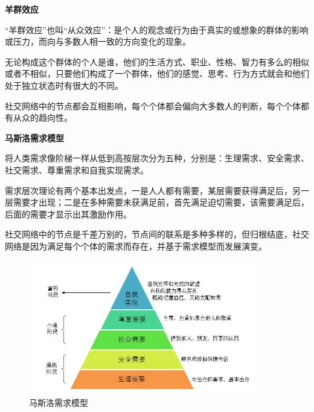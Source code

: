 \begin{frame}
	\textbf{羊群效应}
	
	“羊群效应”也叫“从众效应”：是个人的观念或行为由于真实的或想象的群体的影响或压力，而向与多数人相一致的方向变化的现象。
	
	无论构成这个群体的个人是谁，他们的生活方式、职业、性格、智力有多么的相似或者不相似，只要他们构成了一个群体，他们的感觉、思考、行为方式就会和他们处于独立状态时有很大的不同。
	
	社交网络中的节点都会互相影响，每个个体都会偏向大多数人的判断，每个个体都有从众的趋向性。
\end{frame}

\begin{frame}
	\textbf{马斯洛需求模型}
	
	将人类需求像阶梯一样从低到高按层次分为五种，分别是：生理需求、安全需求、社交需求、尊重需求和自我实现需求。
	
	需求层次理论有两个基本出发点，一是人人都有需要，某层需要获得满足后，另一层需要才出现；二是在多种需要未获满足前，首先满足迫切需要，该需要满足后，后面的需要才显示出其激励作用。
	
	社交网络中的节点是千差万别的，节点间的联系是多种多样的，但归根结底，社交网络是因为满足每个个体的需求而存在，并基于需求模型而发展演变。
\end{frame}

\begin{frame}

	\begin{figure}[htbp]
		\centering
		\includegraphics[width=0.9\textwidth]{pic/t9.jpg}
		\caption{马斯洛需求模型}
	\end{figure}

\end{frame}


